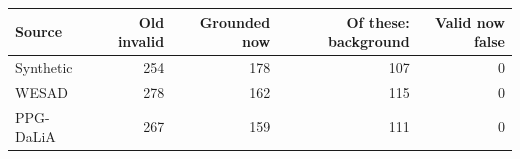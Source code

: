 \begin{tabular}{lrrrr}
\toprule
Source & Old invalid & Grounded now & Of these: background & Valid now false \\
\midrule
Synthetic & 254 & 178 & 107 & 0 \\
WESAD & 278 & 162 & 115 & 0 \\
PPG-DaLiA & 267 & 159 & 111 & 0 \\
\bottomrule
\end{tabular}
